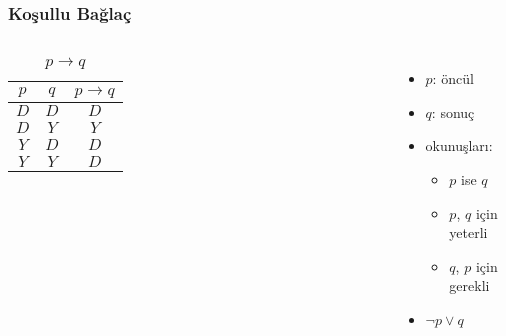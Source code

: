 \documentclass[dvipsnames]{beamer}
\theoremstyle{definition}
\theoremstyle{example}
\theoremstyle{plain}
\begin{document}
\begin{frame}
  \frametitle{Koşullu Bağlaç}

  \begin{columns}
    \begin{table}
      \caption{$p \rightarrow q$}
      \begin{tabular}{|c|c||c|}\hline
        $p$ & $q$ & $p \rightarrow q$\\\hline\hline
        $D$ & $D$ & $D$              \\\hline
        $D$ & $Y$ & $Y$              \\\hline
        $Y$ & $D$ & $D$              \\\hline
        $Y$ & $Y$ & $D$              \\\hline
      \end{tabular}
    \end{table}

    \pause
    \begin{itemize}
      \item $p$: \alert{öncül}
      \item $q$: \alert{sonuç}

      \item okunuşları:
      \begin{itemize}
        \item $p$ ise $q$
        \item $p$, $q$ için yeterli
        \item $q$, $p$ için gerekli
      \end{itemize}

      \pause
      \item $\neg p \vee q$
    \end{itemize}
  \end{columns}
\end{frame}
\end{document}
